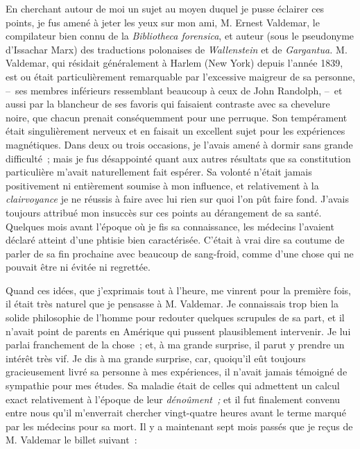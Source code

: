 \documentclass[french,twoside]{book} %
\begin{document}
En cherchant autour de moi un sujet au moyen duquel je pusse éclairer ces points, je fus amené à jeter les yeux sur mon ami, M. Ernest Valdemar, le compilateur bien connu de la \emph{Bibliotheca forensica}, et auteur (sous le pseudonyme d’Issachar Marx) des traductions polonaises de \emph{Wallenstein} et de \emph{Gargantua.} M. Valdemar, qui résidait généralement à Harlem (New York) depuis l’année 1839, est ou était particulièrement remarquable par l’excessive maigreur de sa personne, – ses membres inférieurs ressemblant beaucoup à ceux de John Randolph, – et aussi par la blancheur de ses favoris qui faisaient contraste avec sa chevelure noire, que chacun prenait conséquemment pour une perruque. Son tempérament était singulièrement nerveux et en faisait un excellent sujet pour les expériences magnétiques. Dans deux ou trois occasions, je l’avais amené à dormir sans grande difficulté ; mais je fus désappointé quant aux autres résultats que sa constitution particulière m’avait naturellement fait espérer. Sa volonté n’était jamais positivement ni entièrement soumise à mon influence, et relativement à la \emph{clairvoyance} je ne réussis à faire avec lui rien sur quoi l’on pût faire fond. J’avais toujours attribué mon insuccès sur ces points au dérangement de sa santé. Quelques mois avant l’époque où je fis sa connaissance, les médecins l’avaient déclaré atteint d’une phtisie bien caractérisée. C’était à vrai dire sa coutume de parler de sa fin prochaine avec beaucoup de sang-froid, comme d’une chose qui ne pouvait être ni évitée ni regrettée.\par
Quand ces idées, que j’exprimais tout à l’heure, me vinrent pour la première fois, il était très naturel que je pensasse à M. Valdemar. Je connaissais trop bien la solide philosophie de l’homme pour redouter quelques scrupules de sa part, et il n’avait point de parents en Amérique qui pussent plausiblement intervenir. Je lui parlai franchement de la chose ; et, à ma grande surprise, il parut y prendre un intérêt très vif. Je dis à ma grande surprise, car, quoiqu’il eût toujours gracieusement livré sa personne à mes expériences, il n’avait jamais témoigné de sympathie pour mes études. Sa maladie était de celles qui admettent un calcul exact relativement à l’époque de leur \emph{dénoûment ;} et il fut finalement convenu entre nous qu’il m’enverrait chercher vingt-quatre heures avant le terme marqué par les médecins pour sa mort. Il y a maintenant sept mois passés que je reçus de M. Valdemar le billet suivant :\par
\end{document}
